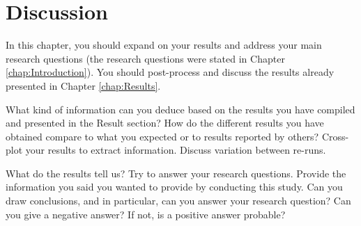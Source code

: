 \chapter{Discussion}

In this chapter, you should expand on your results and address your main research questions (the research questions were stated in Chapter \ref{chap:Introduction}). You should post-process and discuss the results already presented in Chapter \ref{chap:Results}.

What kind of information can you deduce based on the results you have compiled and presented in the Result section? How do the different results you have obtained compare to what you expected or to results reported by others? Cross-plot your results to extract information. Discuss variation between re-runs.

What do the results tell us? Try to answer your research questions. Provide the information you said you wanted to provide by conducting this study. Can you draw conclusions, and in particular, can you answer your research question? Can you give a negative answer? If not, is a positive answer probable?